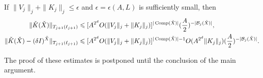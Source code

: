 \documentclass[11pt]{amsart}
\numberwithin{equation}{section}
\numberwithin{theorem}{section}
\newcommand{\1}{{\bf 1}}
\newcommand{\Comp}{\operatorname{Comp}}
\begin{document}
\begin{lemma} \label{lem:NonlinearCheckK}
  If $\|V_{j}\|_{j}+\|K_{j}\|_{j}\leq \epsilon$ and $\epsilon=\epsilon(A, L)$ is
  sufficiently small, then
  \begin{align}
    \label{e:NonlinearCheckK}
    \|\check{K}(\check X)\|_{T_{j+1}(\ell_{j+1})}
    &\leq [ A^{2^d}O( \|V_j\|_j +
  \|K_j\|_j)]^{|\Comp(\check X)|}
      (\frac{A}{2})^{-|\cB_j(\check{X})|},
  \\
    \label{e:NonlinearCheckK2}
    \|\check{K}(\check X)-(\delta I)^{\check X}\|_{T_{j+1}(\ell_{j+1})}
    &\leq
      [A^{2^d}O( \|V_j\|_j + \|K_j\|_j)]^{|\Comp(\check X)|-1}O(A^{2^d}\|K_j\|_j)
      (\frac{A}{2})^{-|\cB_j(\check{X})|}
      .
\end{align}
\end{lemma} The proof of these estimates is postponed until the conclusion of the main argument.
\end{document}
